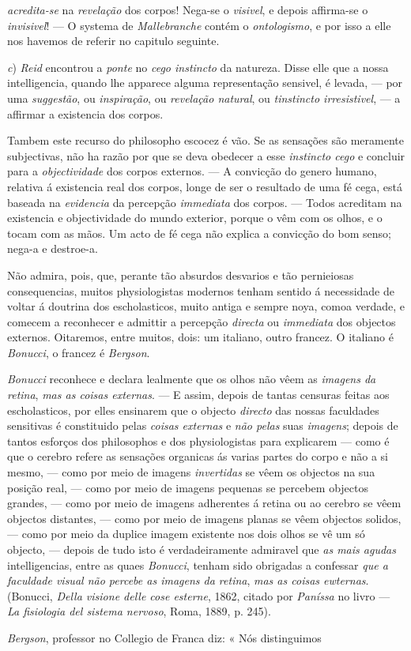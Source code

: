 \emph{acredita-se} na \emph{revelação} dos corpos! Nega-se o \emph{visivel}, e depois affirma-se o \emph{invisivel}! --- O systema de \emph{Mallebranche} contém o \emph{ontologismo}, e por isso a elle nos havemos de referir no capitulo seguinte.\par \emph{c}) \emph{Reid} encontrou a \emph{ponte} no \emph{cego instincto} da natureza. Disse elle que a nossa intelligencia, quando lhe apparece alguma representação sensivel, é levada, --- por uma \emph{suggestão}, ou \emph{inspiração}, ou \emph{revelação natural}, ou \emph{tinstincto irresistivel}, --- a affirmar a existencia dos corpos.\par Tambem este recurso do philosopho escocez é vão. Se as sensações são meramente subjectivas, não ha razão por que se deva obedecer a esse \emph{instincto cego} e concluir para a \emph{objectividade} dos corpos externos. --- A convicção do genero humano, relativa á existencia real dos corpos, longe de ser o resultado de uma fé cega, está baseada na \emph{evidencia} da percepção \emph{immediata} dos corpos. --- Todos acreditam na existencia e objectividade do mundo exterior, porque o vêm com os olhos, e o tocam com as mãos. Um acto de fé cega não explica a convicção do bom senso; nega-a e destroe-a.\par *\par Não admira, pois, que, perante tão absurdos desvarios e tão pernieiosas consequencias, muitos physiologistas modernos tenham sentido á necessidade de voltar á doutrina dos escholasticos, muito antiga e sempre noya, comoa verdade, e comecem a reconhecer e admittir a percepção \emph{directa} ou \emph{immediata} dos objectos externos. Oitaremos, entre muitos, dois: um italiano, outro francez. O italiano é \emph{Bonucci}, o francez é \emph{Bergson}.\par \emph{Bonucci} reconhece e declara lealmente que os olhos não vêem as \emph{imagens da retina}, \emph{mas as coisas externas}. --- E assim, depois de tantas censuras feitas aos escholasticos, por elles ensinarem que o objecto \emph{directo} das nossas faculdades sensitivas é constituido pelas \emph{coisas externas} e \emph{não pelas} suas \emph{imagens}; depois de tantos esforços dos philosophos e dos physiologistas para explicarem --- como é que o cerebro refere as sensações organicas ás varias partes do corpo e não a si mesmo, --- como por meio de imagens \emph{invertidas} se vêem os objectos na sua posição real, --- como por meio de imagens pequenas se percebem objectos grandes, --- como por meio de imagens adherentes á retina ou ao cerebro se vêem objectos distantes, --- como por meio de imagens planas se vêem objectos solidos, --- como por meio da duplice imagem existente nos dois olhos se vê um só objecto, --- depois de tudo isto é verdadeiramente admiravel que \emph{as mais agudas} intelligencias, entre as quaes \emph{Bonucci}, tenham sido obrigadas a confessar \emph{que a faculdade visual não percebe as imagens da retina}, \emph{mas as coisas ewternas}. (Bonucci, \emph{Della visione delle cose esterne}, 1862, citado por \emph{Paníssa} no livro --- \emph{La fisiologia del sistema nervoso}, Roma, 1889, p. 245).\par \emph{Bergson}, professor no Collegio de Franca diz: « Nós distinguimos 